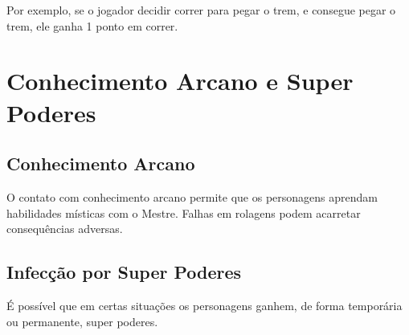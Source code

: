 \documentclass[a4paper,12pt]{book}
\begin{document}
Por exemplo, se o jogador decidir correr para pegar o trem, e consegue pegar o trem, ele ganha 1 ponto em correr.


\chapter{Conhecimento Arcano e Super Poderes}

\section{Conhecimento Arcano}

O contato com conhecimento arcano permite que os personagens aprendam habilidades místicas com o Mestre. Falhas em rolagens podem acarretar consequências adversas.

\section{Infecção por Super Poderes}

É possível que em certas situações os personagens ganhem, de forma temporária ou permanente, super poderes.
\end{document}
